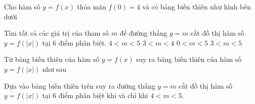 \begin{ex}%
 Cho hàm số $y=f(x)$ thỏa mãn $f(0)=4$ và có bảng biến thiên như hình bên dưới
 \begin{center}
 \end{center}
 Tìm tất cả các giá trị của tham số $m$ để đường thẳng $y=m$ cắt đồ thị hàm số $y=f\left(|x|\right)$ tại $6$ điểm phân biệt.
 \choice
  {\True $4<m<5$}
  {$3<m<4$}
  {$0<m<5$}
  {$3<m<5$}
 \loigiai
  {
  Từ bảng biến thiên của hàm số $y=f(x)$ suy ra bảng biến thiên của hàm số $y=f\left(|x|\right)$ như sau
  \begin{center}
  \end{center}
  Dựa vào bảng biến thiên trên suy ra đường thẳng $y=m$ cắt đồ thị hàm số $y=f\left(|x|\right)$ tại $6$ điểm phân biệt khi và chỉ khi $4<m<5$.
  }
\end{ex}

